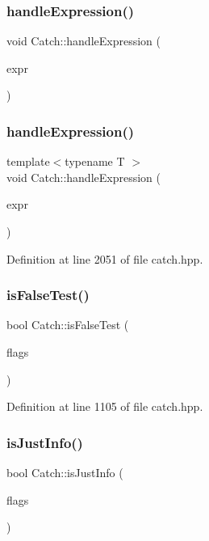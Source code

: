 \subsubsection{handleExpression()\hspace{0.1cm}{\footnotesize\ttfamily [1/2]}}
{\footnotesize\ttfamily void Catch\+::handle\+Expression (\begin{DoxyParamCaption}\item[{\textbf{ I\+Transient\+Expression} const \&}]{expr }\end{DoxyParamCaption})}

\mbox{\label{namespace_catch_af2c93db76668a981e75ae835699efce7}} 
\subsubsection{handleExpression()\hspace{0.1cm}{\footnotesize\ttfamily [2/2]}}
{\footnotesize\ttfamily template$<$typename T $>$ \\
void Catch\+::handle\+Expression (\begin{DoxyParamCaption}\item[{\textbf{ Expr\+Lhs}$<$ T $>$ const \&}]{expr }\end{DoxyParamCaption})}



Definition at line 2051 of file catch.\+hpp.

\mbox{\label{namespace_catch_a93ef4e3e307a2021ca0d41b32c0e54b0}} 
\subsubsection{isFalseTest()}
{\footnotesize\ttfamily bool Catch\+::is\+False\+Test (\begin{DoxyParamCaption}\item[{int}]{flags }\end{DoxyParamCaption})\hspace{0.3cm}{\ttfamily [inline]}}



Definition at line 1105 of file catch.\+hpp.

\mbox{\label{namespace_catch_a54b01af61673a3e1f21f31713639b180}} 
\subsubsection{isJustInfo()}
{\footnotesize\ttfamily bool Catch\+::is\+Just\+Info (\begin{DoxyParamCaption}\item[{int}]{flags }\end{DoxyParamCaption})}

